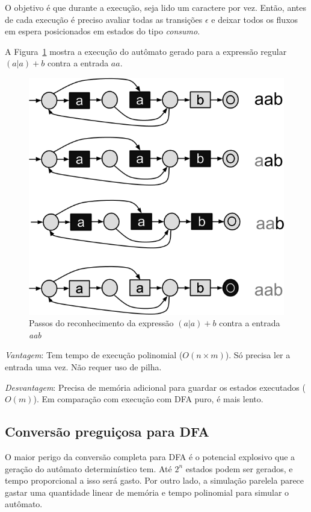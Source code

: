\documentclass[a4paper,12pt,oneside,onecolumn]{uerj}
\begin{document}
O objetivo é que durante a execução, seja lido um caractere por vez. Então, antes de cada execução é preciso avaliar todas as transições $\epsilon$ e deixar todos os fluxos em espera posicionados em estados do tipo \emph{consumo}.

A Figura~\ref{fig:nfa_simultaneo} mostra a execução do autômato gerado para a expressão regular $(a|a)+b$ contra a entrada $aa$.

\begin{figure}[!htbp]
  \centering
  \includegraphics[scale=0.5]{figures/nfa_simultaneo.png}
  \caption{Passos do reconhecimento da expressão $(a|a)+b$ contra a entrada \emph{aab}}
  \label{fig:nfa_simultaneo}
\end{figure}

\emph{Vantagem}: Tem tempo de execução polinomial ($O(n \times m)$). Só precisa ler a entrada uma vez. Não requer uso de pilha.

\emph{Desvantagem}: Precisa de memória adicional para guardar os estados executados ($O(m)$). Em comparação com execução com DFA puro, é mais lento.

\subsection{Conversão preguiçosa para DFA}

O maior perigo da conversão completa para DFA é o potencial explosivo que a geração do autômato determinístico tem. Até $2^n$ estados podem ser gerados, e tempo proporcional a isso será gasto. Por outro lado, a simulação parelela parece gastar uma quantidade linear de memória e tempo polinomial para simular o autômato.
\end{document}
